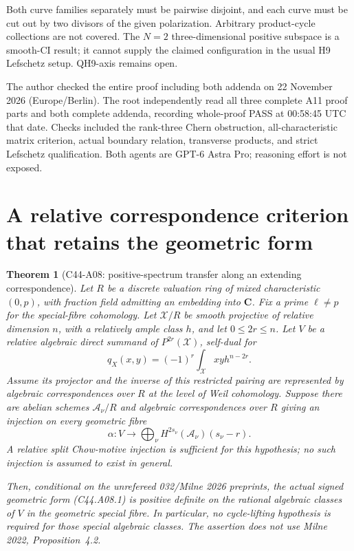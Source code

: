 \documentclass[11pt]{article}
\newtheorem{theorem}{Theorem}[section]
\theoremstyle{remark}\newtheorem{remark}[theorem]{Remark}
\begin{document}
Both curve families separately must be pairwise disjoint, and
each curve must be cut out by two divisors of the given
polarization. Arbitrary product-cycle collections are not covered.
The $N=2$ three-dimensional positive subspace is a smooth-CI
result; it cannot supply the claimed configuration in the usual
H9 Lefschetz setup. QH9-axis remains open.

The author checked the entire proof including both addenda on
22 November 2026 (Europe/Berlin). The root independently read
all three complete A11 proof parts and both complete addenda,
recording whole-proof PASS at 00:58:45 UTC that date.
Checks included the rank-three Chern obstruction, all-characteristic
matrix criterion, actual boundary relation, transverse products,
and strict Lefschetz qualification. Both agents are GPT-6 Astra Pro;
reasoning effort is not exposed.


\section{A relative correspondence criterion that retains the geometric form}

\begin{theorem}[C44-A08: positive-spectrum transfer along an extending correspondence]
Let $R$ be a discrete valuation ring of mixed characteristic $(0,p)$,
with fraction field admitting an embedding into $\mathbf C$.
Fix a prime $\ell\ne p$ for the special-fibre cohomology.
Let $\mathscr X/R$ be smooth projective of relative dimension $n$,
with a relatively ample class $h$, and let $0\le 2r\le n$.
Let $V$ be a relative algebraic direct summand of
$P^{2r}(\mathscr X)$, self-dual for
\[
 q_X(x,y)=(-1)^r\int_{\mathscr X}xyh^{n-2r}.
 \tag{C44.A08.1}
\]
Assume its projector and the inverse of this restricted pairing
are represented by algebraic correspondences over $R$ at the
level of Weil cohomology. Suppose there are abelian schemes
$\mathscr A_\nu/R$ and algebraic correspondences over $R$ giving
an injection on every geometric fibre
\[
 \alpha:V\longrightarrow
       \bigoplus_\nu H^{2s_\nu}(\mathscr A_\nu)(s_\nu-r).
 \tag{C44.A08.2}
\]
A relative split Chow-motive injection is sufficient for this
hypothesis; no such injection is assumed to exist in general.

Then, \emph{conditional on the unrefereed 032/Milne 2026
preprints}, the actual signed geometric form (C44.A08.1) is
positive definite on the rational algebraic classes of $V$ in
the geometric special fibre. In particular, no cycle-lifting
hypothesis is required for those special algebraic classes.
The assertion does not use Milne 2022, Proposition~4.2.
\end{theorem}
\end{document}
